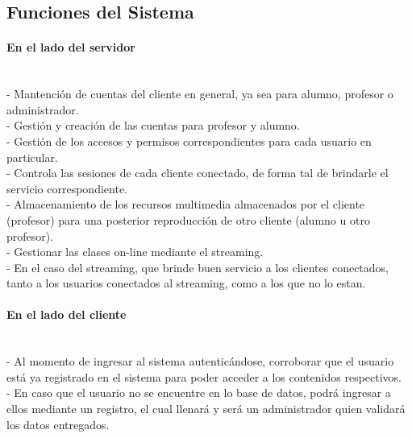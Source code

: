 \documentclass[12pt]{article}
\begin{document}
\subsection{Funciones del Sistema}

\paragraph{En el lado del servidor\\\\}

-	Mantención de cuentas del cliente en general, ya sea para alumno, profesor o administrador.\\

-	Gestión y creación de las cuentas para profesor y alumno.\\

-	Gestión de los accesos y permisos correspondientes para cada usuario en particular.\\

-	Controla las sesiones de cada cliente conectado, de forma tal de brindarle el servicio correspondiente.\\

-	Almacenamiento de los recursos multimedia almacenados por el cliente (profesor) para una posterior
reproducción de otro cliente (alumno u otro profesor).\\

-	Gestionar las clases on-line mediante el streaming.\\

-	En el caso del streaming, que brinde buen servicio a los clientes conectados, tanto a los usuarios
conectados al streaming, como a los que no lo estan.\\

\paragraph{En el lado del cliente\\\\}

-	Al momento de ingresar al sistema autenticándose, corroborar que el usuario está ya registrado en
el sistema para poder acceder a los contenidos respectivos.\\

-	En caso que el usuario no se encuentre en lo base de datos, podrá ingresar a ellos mediante un 
registro, el cual llenará y será un administrador quien validará los datos entregados.\\
\end{document}
